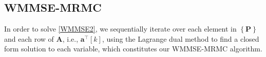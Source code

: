 \documentclass[10pt,journal]{IEEEtran}
\newcommand{\paren}[1]{\left({#1}\right)}
\newcommand{\bracket}[1]{{\left [{#1}\right ]}}
\newcommand{\braces}[1]{{\left\{ {#1}\right\}}}
\newcommand{\PiB}{\mathbf{P}_{\textrm{u},i}\bracket{k}}
\newcommand{\PBj}{\mathbf{P}_{\textrm{d},j}\bracket{k}}
\theoremstyle{definition}
\begin{document}
\fi

\subsection{WMMSE-MRMC} \label{subsec:seq}
In order to solve \eqref{WMMSE2}, we sequentially iterate over each element in $\braces{\mathbf{P}}$ and each row of $\mathbf{A}$, i.e., $\mathbf{a}^\top\bracket{k}$,
using the Lagrange dual method to find a closed form solution to each variable, which constitutes our WMMSE-MRMC algorithm. 
 
\end{document}
